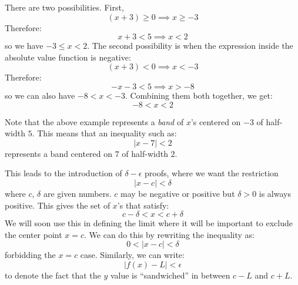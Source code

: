 \begin{itemize}
\begin{example}
        There are two possibilities. First,
        \begin{equation}
            (x+3) \ge 0 \implies x \ge -3
            \label{eq:}
        \end{equation}
        Therefore:
        \begin{equation}
            x+3<5 \implies x<2
            \label{eq:}
        \end{equation}
        so we have $-3 \le x<2$. The second possibility is when the expression inside the absolute value function is negative: 
        \begin{equation}
            (x+3) < 0 \implies x < -3
            \label{eq:}
        \end{equation}
        Therefore:
        \begin{equation}
            -x-3<5 \implies x>-8
            \label{eq:}
        \end{equation}
        so we can also have $-8<x<-3$. Combining them both together, we get:
        \begin{equation}
            -8<x<2
            \label{eq:}
        \end{equation}
    \end{example}
    \begin{idea}
        Note that the above example represents a \emph{band} of $x$'s centered on $-3$ of half-width $5$. This means that an inequality such as:
        \begin{equation}
            |x-7|<2
            \label{eq:}
        \end{equation}
        represents a band centered on $7$ of half-width $2$.
        \vspace{2mm}

        This leads to the introduction of $\delta-\epsilon$ proofs, where we want the restriction
        \begin{equation}
            |x-c|<\delta
            \label{eq:}
        \end{equation}
        where $c$, $\delta$ are given numbers. $c$ may be negative or positive but $\delta>0$ is always positive. This gives the set of $x$'s that satisfy:
        \begin{equation}
            c-\delta < x < c+\delta
            \label{eq:}
        \end{equation}
        We will soon use this in defining the limit where it will be important to exclude the center point $x=c$. We can do this by rewriting the inequality as:
        \begin{equation}
            0 < |x-c| < \delta
            \label{eq:}
        \end{equation}
        forbidding the $x=c$ case. Similarly, we can write:
        \begin{equation}
            |f(x)-L|<\epsilon
            \label{eq:}
        \end{equation}
        to denote the fact that the $y$ value is ``sandwiched'' in between $c-L$ and $c+L$.
    \end{idea}
\end{itemize}